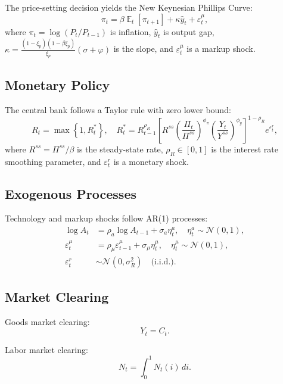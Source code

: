 \documentclass[12pt]{article}
\theoremstyle{plain}
\theoremstyle{definition}
\theoremstyle{remark}
\DeclareMathOperator{\E}{\mathbb{E}}
\newcommand{\eps}{\varepsilon}
\begin{document}
The price-setting decision yields the New Keynesian Phillips Curve:
\begin{equation}
\pi_t = \beta \E_t[\pi_{t+1}] + \kappa \hat{y}_t + \eps_t^\mu, \label{eq:nkpc_full}
\end{equation}
where $\pi_t = \log(P_t/P_{t-1})$ is inflation, $\hat{y}_t$ is output gap, $\kappa = \frac{(1-\xi_p)(1-\beta\xi_p)}{\xi_p}(\sigma + \varphi)$ is the slope, and $\eps_t^\mu$ is a markup shock.


\subsection{Monetary Policy}

The central bank follows a Taylor rule with zero lower bound:
\begin{equation}
R_t = \max\left\{1, R_t^* \right\}, \quad R_t^* = R_{t-1}^{\rho_R} \left[ R^{ss} \left(\frac{\Pi_t}{\Pi^{ss}}\right)^{\phi_\pi} \left(\frac{Y_t}{Y^{ss}}\right)^{\phi_y} \right]^{1-\rho_R} e^{\eps_t^r}, \label{eq:taylor_zlb_full}
\end{equation}
where $R^{ss} = \Pi^{ss}/\beta$ is the steady-state rate, $\rho_R \in [0,1]$ is the interest rate smoothing parameter, and $\eps_t^r$ is a monetary shock.


\subsection{Exogenous Processes}

Technology and markup shocks follow AR(1) processes:
\begin{align}
\log A_t &= \rho_a \log A_{t-1} + \sigma_a \eta_t^a, \quad \eta_t^a \sim \mathcal{N}(0,1), \\
\eps_t^\mu &= \rho_\mu \eps_{t-1}^\mu + \sigma_\mu \eta_t^\mu, \quad \eta_t^\mu \sim \mathcal{N}(0,1), \\
\eps_t^r &\sim \mathcal{N}(0, \sigma_R^2) \quad \text{(i.i.d.)}.
\end{align}


\subsection{Market Clearing}

Goods market clearing:
\begin{equation}
Y_t = C_t.
\end{equation}

Labor market clearing:
\begin{equation}
N_t = \int_0^1 N_t(i) \, di.
\end{equation}
\end{document}
